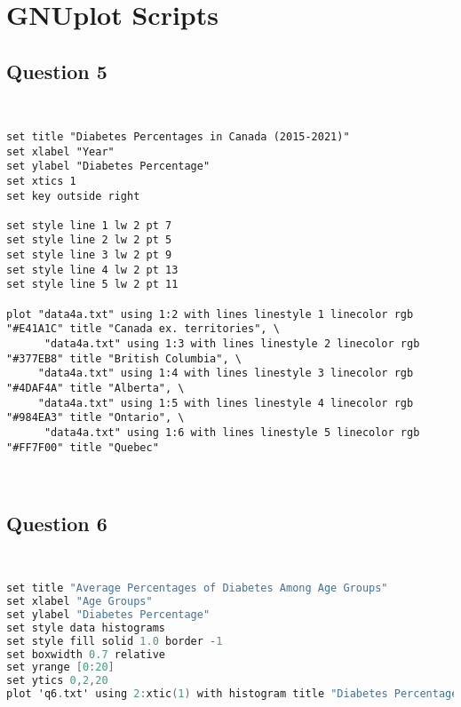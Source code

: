 \chapter{{GNUplot Scripts}}

\section{{Question 5}}

\begin{lstlisting}[language=GNUplot, caption=\textit{GNUplot Source Code}]


set title "Diabetes Percentages in Canada (2015-2021)"
set xlabel "Year"
set ylabel "Diabetes Percentage"
set xtics 1
set key outside right

set style line 1 lw 2 pt 7
set style line 2 lw 2 pt 5
set style line 3 lw 2 pt 9
set style line 4 lw 2 pt 13
set style line 5 lw 2 pt 11

plot "data4a.txt" using 1:2 with lines linestyle 1 linecolor rgb "#E41A1C" title "Canada ex. territories", \
      "data4a.txt" using 1:3 with lines linestyle 2 linecolor rgb "#377EB8" title "British Columbia", \
     "data4a.txt" using 1:4 with lines linestyle 3 linecolor rgb "#4DAF4A" title "Alberta", \
     "data4a.txt" using 1:5 with lines linestyle 4 linecolor rgb "#984EA3" title "Ontario", \
      "data4a.txt" using 1:6 with lines linestyle 5 linecolor rgb "#FF7F00" title "Quebec"
      
      

\end{lstlisting}

\section{{Question 6}}

\begin{lstlisting}[language=C, caption=\textit{GNUplot Source Code}]


set title "Average Percentages of Diabetes Among Age Groups"
set xlabel "Age Groups"
set ylabel "Diabetes Percentage"
set style data histograms
set style fill solid 1.0 border -1
set boxwidth 0.7 relative
set yrange [0:20]
set ytics 0,2,20
plot 'q6.txt' using 2:xtic(1) with histogram title "Diabetes Percentage"


\end{lstlisting}







